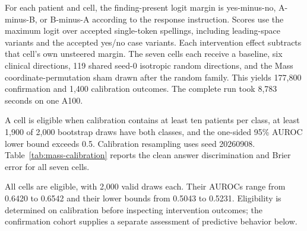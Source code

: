 For each patient and cell, the finding-present logit margin is yes-minus-no,
A-minus-B, or B-minus-A according to the response instruction.
Scores use the maximum logit over accepted single-token spellings, including
leading-space variants and the accepted yes/no case variants.
Each intervention effect subtracts that cell's own unsteered margin.
The seven cells each receive a baseline, six clinical directions,
119 shared seed-0 isotropic random directions, and the Mass
coordinate-permutation sham drawn after the random family. This yields
177,800 confirmation and 1,400 calibration outcomes. The complete run
took 8,783 seconds on one A100.

A cell is eligible when calibration contains at least ten patients per
class, at least 1,900 of 2,000 bootstrap draws have both classes, and the
one-sided 95\% AUROC lower bound exceeds 0.5. Calibration resampling uses
seed 20260908. Table~\ref{tab:mass-calibration} reports the clean answer
discrimination and Brier error for all seven cells.

\begin{table}[H]
\centering
\caption{Mass capability calibration across prompt conditions.}
\label{tab:mass-calibration}
\end{table}

All cells are eligible, with 2,000 valid draws each. Their AUROCs range
from 0.6420 to 0.6542 and their lower bounds from 0.5043 to 0.5231.
Eligibility is determined on calibration before inspecting intervention
outcomes; the confirmation cohort supplies a separate assessment of
predictive behavior below.

